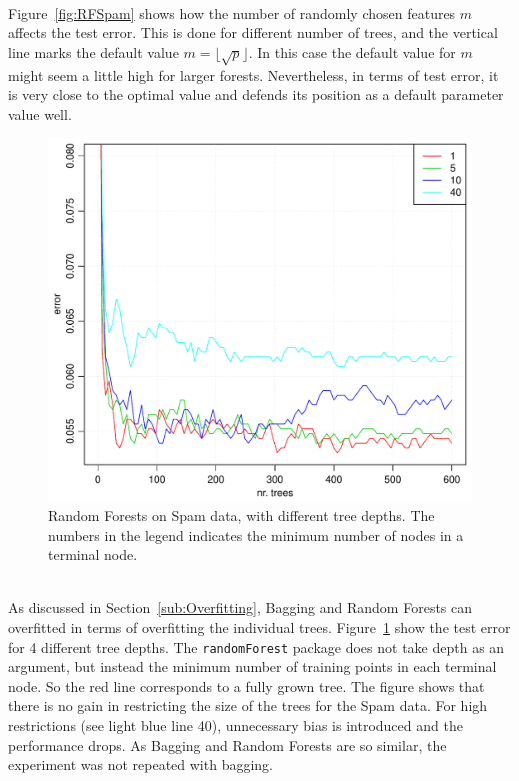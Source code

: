 \\
Figure~\ref{fig:RFSpam} shows how the number of randomly chosen features $m$ affects the test error. This is done for different number of trees, and the vertical line marks the default value $m = \lfloor \sqrt{p} \rfloor$. In this case the default value for $m$ might seem a little high for larger forests. Nevertheless, in terms of test error, it is very close to the optimal value and defends its position as a default parameter value well. 
\\
\begin{figure}[htpb]
\begin{center}
    \includegraphics[scale=0.5]{./figures/RFTreeDepth.pdf}
\end{center}
\caption{Random Forests on Spam data, with different tree depths. The numbers in the legend indicates the minimum number of nodes in a terminal node.}
\label{fig:RFTreeDepth}
\end{figure}
\\
As discussed in Section~\ref{sub:Overfitting}, Bagging and Random Forests can overfitted in terms of overfitting the individual trees. Figure~\ref{fig:RFTreeDepth} show the test error for 4 different tree depths. The \verb+randomForest+ package does not take depth as an argument, but instead the minimum number of training points in each terminal node. So the red line corresponds to a fully grown tree. The figure shows that there is no gain in restricting the size of the trees for the Spam data. For high restrictions (see light blue line 40), unnecessary bias is introduced and the performance drops.  As Bagging and Random Forests are so similar, the experiment was not repeated with bagging.
